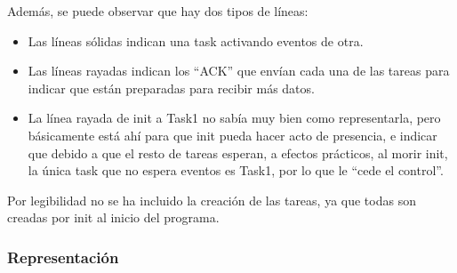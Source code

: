 \documentclass[a4paper,openright,12pt]{article}
\begin{document}
Además, se puede observar que hay dos tipos de líneas:
\begin{itemize}
    \item Las líneas sólidas indican una task activando eventos de otra.
    \item Las líneas rayadas indican los ``ACK'' que envían cada una de las tareas para indicar que están preparadas para recibir más datos.
    \item La línea rayada de init a Task1 no sabía muy bien como representarla, pero básicamente está ahí para que init pueda hacer acto de presencia, e indicar que debido a que
          el resto de tareas esperan, a efectos prácticos, al morir init, la única task que no espera eventos es Task1, por lo que le ``cede el control''.
\end{itemize}

Por legibilidad no se ha incluido la creación de las tareas, ya que todas son creadas por init al inicio del programa.

\subsubsection{Representación}

\bigskip
\end{document}
